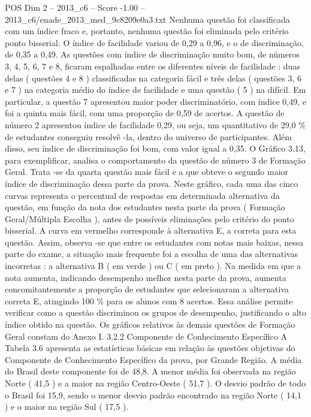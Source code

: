 \begin{textsample}{POS Dim 2 – 2013\_c6 – Score -1.00 – 2013\_c6/enade\_2013\_med\_9c8209e0a3.txt}
Nenhuma questão foi classificada com um índice fraco e, portanto, nenhuma questão foi eliminada pelo critério ponto bisserial.
O índice de facilidade variou de 0,29 a 0,96, e o de discriminação, de 0,35 a 0,49.
As questões com índice de discriminação muito bom, de números 3, 4, 5, 6, 7 e 8, ficaram espalhadas entre os diferentes níveis de facilidade : duas delas ( questões 4 e 8 ) classificadas na categoria fácil e três delas ( questões 3, 6 e 7 ) na categoria médio do índice de facilidade e uma questão ( 5 ) na difícil.
Em particular, a questão 7 apresentou maior poder discriminatório, com índice 0,49, e foi a quinta mais fácil, com uma proporção de 0,59 de acertos.
A questão de número 2 apresentou índice de facilidade 0,29, ou seja, um quantitativo de 29,0 \% de estudantes conseguiu resolvê -la, dentro do universo de participantes.
Além disso, seu índice de discriminação foi bom, com valor igual a 0,35.
O Gráfico 3.13, para exemplificar, analisa o comportamento da questão de número 3 de Formação Geral.
Trata -se da quarta questão mais fácil e a que obteve o segundo maior índice de discriminação dessa parte da prova.
Neste gráfico, cada uma das cinco curvas representa o percentual de respostas em determinada alternativa da questão, em função da nota dos estudantes nesta parte da prova ( Formação Geral/Múltipla Escolha ), antes de possíveis eliminações pelo critério do ponto bisserial.
A curva em vermelho corresponde à alternativa E, a correta para esta questão.
Assim, observa -se que entre os estudantes com notas mais baixas, nessa parte do exame, a situação mais frequente foi a escolha de uma das alternativas incorretas : a alternativa B ( em verde ) ou C ( em preto ).
Na medida em que a nota aumenta, indicando desempenho melhor nesta parte da prova, aumenta concomitantemente a proporção de estudantes que selecionaram a alternativa correta E, atingindo 100 \% para os alunos com 8 acertos.
Essa análise permite verificar como a questão discriminou os grupos de desempenho, justificando o alto índice obtido na questão.
Os gráficos relativos às demais questões de Formação Geral constam do Anexo I. 3.2.2 Componente de Conhecimento Específico A Tabela 3.6 apresenta as estatísticas básicas em relação às questões objetivas do Componente de Conhecimento Específico da prova, por Grande Região.
A média do Brasil deste componente foi de 48,8.
A menor média foi observada na região Norte ( 41,5 ) e a maior na região Centro-Oeste ( 51,7 ).
O desvio padrão de todo o Brasil foi 15,9, sendo o menor desvio padrão encontrado na região Norte ( 14,1 ) e o maior na região Sul ( 17,5 ).

\end{textsample}
